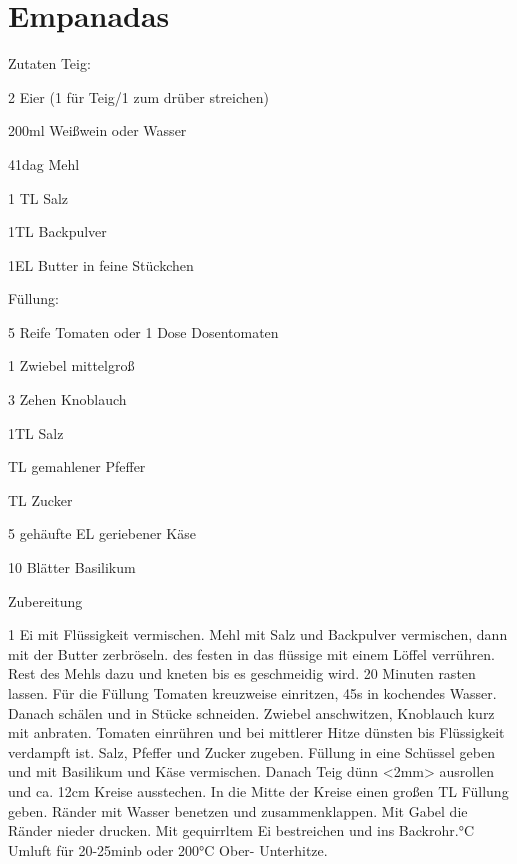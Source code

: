 \chapter*{Empanadas}
\begin{multicols}{2}
 {\Large Zutaten}
 Teig:
 \begin{Zutaten}
		\item 2 Eier (1 für Teig/1 zum drüber streichen)
		\item 200ml Weißwein oder Wasser
		\item 41dag Mehl
		\item 1 TL Salz
		\item 1TL Backpulver
		\item 1EL Butter in feine Stückchen	
\end{Zutaten}
Füllung:
\begin{Zutaten}
		\item 5 Reife Tomaten oder 1 Dose Dosentomaten
		\item 1 Zwiebel mittelgroß
		\item 3 Zehen Knoblauch
		\item 1TL Salz
		\item {} TL gemahlener Pfeffer
		\item {} TL Zucker
		\item 5 gehäufte EL geriebener Käse
		\item 10 Blätter Basilikum
		
\end{Zutaten}
\columnbreak
{}
\end{multicols}

{\Large Zubereitung} \newline
\begin{addmargin}[1cm]{0cm}
	1 Ei mit Flüssigkeit vermischen. Mehl mit Salz und Backpulver vermischen, dann mit der Butter
	zerbröseln.\newline
	 des festen in das flüssige mit einem Löffel verrühren.
	Rest des Mehls dazu und kneten bis es geschmeidig wird.
	20 Minuten rasten lassen.\newline
	Für die Füllung Tomaten kreuzweise einritzen, 45s in kochendes Wasser. Danach schälen und in Stücke
	schneiden. Zwiebel anschwitzen, Knoblauch kurz mit anbraten. Tomaten einrühren und bei mittlerer
	Hitze dünsten bis Flüssigkeit verdampft ist.\newline
	Salz, Pfeffer und Zucker zugeben.\newline\newline
	Füllung in eine Schüssel geben und mit Basilikum und Käse vermischen.
	Danach Teig dünn <2mm> ausrollen und ca. 12cm Kreise ausstechen.\newline
	In die Mitte der Kreise einen großen TL Füllung geben. Ränder mit Wasser benetzen und
	zusammenklappen.\newline
	Mit Gabel die Ränder nieder drucken.\newline
	Mit gequirrltem Ei bestreichen und ins Backrohr.°C Umluft für 20-25minb oder 200°C Ober- Unterhitze.
	
\end{addmargin}
